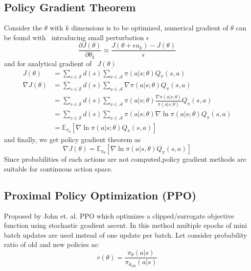 \subsection{Policy Gradient Theorem}
Consider the $\displaystyle \theta $ with $\displaystyle k$ dimensions is to be optimized, numerical gradient of $\displaystyle \theta $ can be found with \ introducing small perturbation $\displaystyle \epsilon $ 
\begin{equation}
\frac{\partial J(\theta )}{\partial \theta _{k}} \approx \frac{J(\theta +\epsilon u_{k} )-J(\theta )}{\epsilon }
\end{equation}
 and for analytical gradient of \ $\displaystyle J(\theta )$
\begin{equation}
\begin{aligned}
J(\theta ) & =\sum _{s\in \mathcal{S}} d(s)\sum _{a\in \mathcal{A}} \pi (a|s;\theta )Q_{\pi } (s,a)\\
\nabla J(\theta ) & =\sum _{s\in \mathcal{S}} d(s)\sum _{a\in \mathcal{A}} \nabla \pi (a|s;\theta )Q_{\pi } (s,a)\\
 & =\sum _{s\in \mathcal{S}} d(s)\sum _{a\in \mathcal{A}} \pi (a|s;\theta )\frac{\nabla \pi (a|s;\theta )}{\pi (a|s;\theta )} Q_{\pi } (s,a)\\
 & =\sum _{s\in \mathcal{S}} d(s)\sum _{a\in \mathcal{A}} \pi (a|s;\theta )\nabla \ln \pi (a|s;\theta )Q_{\pi } (s,a)\\
 & =\mathbb{E}_{\pi _{\theta }} [\nabla \ln \pi (a|s;\theta )Q_{\pi } (s,a)]
\end{aligned}
\end{equation}
and finally, we get policy gradient theorem as
\begin{equation}
\nabla J(\theta )=\mathbb{E}_{\pi _{\theta }} [\nabla \ln \pi (a|s,\theta )Q_{\pi } (s,a)]
\end{equation}
Since probabilities of each actions are not computed,policy gradient methods are suitable for continuous action space.

\subsection{Proximal Policy Optimization (PPO)}
Proposed by John et. al. PPO\cite{schulman2017proximal} which optimizes a clipped/surrogate objective function using stochastic gradient ascent. In this method multiple epochs of mini batch updates are used instead of one update per batch. Let consider probability ratio of old and new policies as:
\begin{equation}
r(\theta )=\frac{\pi _{\theta } (a|s)}{\pi _{\theta _{\text{old}}} (a|s)}
\end{equation}

